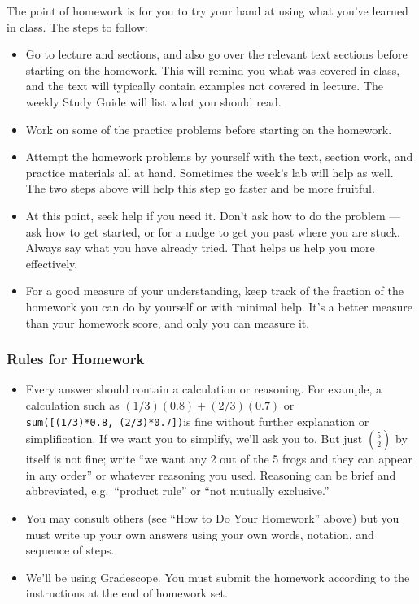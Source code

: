 \documentclass[11pt]{article}
\providecommand{\tightlist}{%
      \setlength{\itemsep}{0pt}\setlength{\parskip}{0pt}}
\begin{document}
The point of homework is for you to try your hand at using what you've
learned in class. The steps to follow:

\begin{itemize}
\tightlist
\item
  Go to lecture and sections, and also go over the relevant text
  sections before starting on the homework. This will remind you what
  was covered in class, and the text will typically contain examples not
  covered in lecture. The weekly Study Guide will list what you should
  read.
\item
  Work on some of the practice problems before starting on the homework.
\item
  Attempt the homework problems by yourself with the text, section work,
  and practice materials all at hand. Sometimes the week's lab will help
  as well. The two steps above will help this step go faster and be more
  fruitful.
\item
  At this point, seek help if you need it. Don't ask how to do the
  problem --- ask how to get started, or for a nudge to get you past
  where you are stuck. Always say what you have already tried. That
  helps us help you more effectively.
\item
  For a good measure of your understanding, keep track of the fraction
  of the homework you can do by yourself or with minimal help. It's a
  better measure than your homework score, and only you can measure it.
\end{itemize}

    \hypertarget{rules-for-homework}{%
\subsubsection{Rules for Homework}\label{rules-for-homework}}

\begin{itemize}
\tightlist
\item
  Every answer should contain a calculation or reasoning. For example, a
  calculation such as \((1/3)(0.8) + (2/3)(0.7)\) or
  \texttt{sum({[}(1/3)*0.8,\ (2/3)*0.7{]})}is fine without further
  explanation or simplification. If we want you to simplify, we'll ask
  you to. But just \({5 \choose 2}\) by itself is not fine; write ``we
  want any 2 out of the 5 frogs and they can appear in any order'' or
  whatever reasoning you used. Reasoning can be brief and abbreviated,
  e.g.~``product rule'' or ``not mutually exclusive.''
\item
  You may consult others (see ``How to Do Your Homework'' above) but you
  must write up your own answers using your own words, notation, and
  sequence of steps.
\item
  We'll be using Gradescope. You must submit the homework according to
  the instructions at the end of homework set.
\end{itemize}
\end{document}
